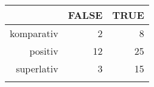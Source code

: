 \begin{tabular}{rrr}
  \lsptoprule
 & FALSE & TRUE \\ 
  \midrule
komparativ & 2 & 8 \\ 
  positiv & 12 & 25 \\ 
  superlativ & 3 & 15 \\ 
   \lspbottomrule
\end{tabular}
